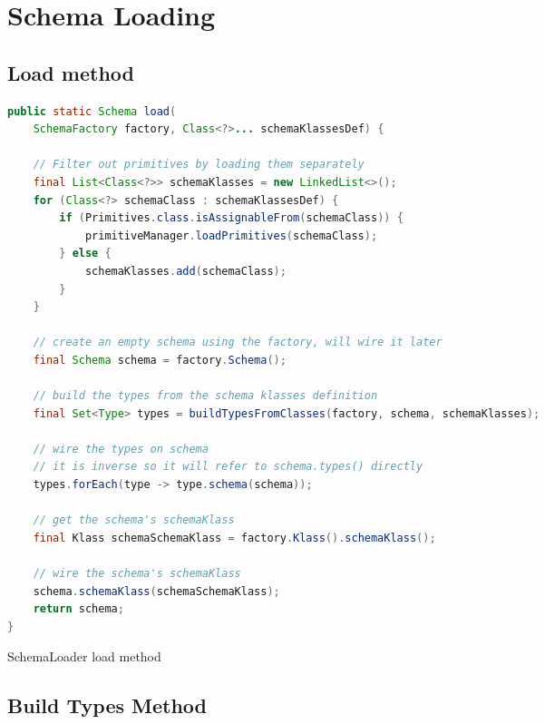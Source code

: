 
\chapter{Schema Loading}\label{appdx:SchemaLoading}

\section{Load method}

\begin{sourcecode} [H]
	\begin{lstlisting}[language=Java, escapechar=|]
public static Schema load(
	SchemaFactory factory, Class<?>... schemaKlassesDef) {

	// Filter out primitives by loading them separately
	final List<Class<?>> schemaKlasses = new LinkedList<>();
	for (Class<?> schemaClass : schemaKlassesDef) {
		if (Primitives.class.isAssignableFrom(schemaClass)) {
			primitiveManager.loadPrimitives(schemaClass);
		} else {
			schemaKlasses.add(schemaClass);
		}
	}

	// create an empty schema using the factory, will wire it later
	final Schema schema = factory.Schema();

	// build the types from the schema klasses definition
	final Set<Type> types = buildTypesFromClasses(factory, schema, schemaKlasses);

	// wire the types on schema
	// it is inverse so it will refer to schema.types() directly
	types.forEach(type -> type.schema(schema));

	// get the schema's schemaKlass
	final Klass schemaSchemaKlass = factory.Klass().schemaKlass();

	// wire the schema's schemaKlass
	schema.schemaKlass(schemaSchemaKlass);
	return schema;
}
	\end{lstlisting}
	\caption{SchemaLoader load method}
	\label{lst:SchemaLoader_load}
\end{sourcecode}

\section{Build Types Method}

